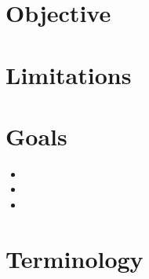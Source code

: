 \documentclass[a4paper,11pt,twoside]{report}
\begin{document}









\section{}

\section{Objective}


\section{Limitations}

\section{Goals}

\begin{itemize}
	\item
	\item 
	\item
\end{itemize} 

\section{Terminology}
\end{document}
